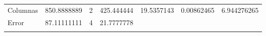 \documentclass[]{book}
\theoremstyle{definition}
\theoremstyle{definition}
\theoremstyle{definition}
\theoremstyle{remark}
\begin{document}
\begin{longtable}[]{@{}lllllll@{}}
\begin{minipage}[t]{0.15\columnwidth}
Columnas\strut
\end{minipage} & \begin{minipage}[t]{0.11\columnwidth}\raggedright
850.8888889\strut
\end{minipage} & \begin{minipage}[t]{0.12\columnwidth}\raggedright
2\strut
\end{minipage} & \begin{minipage}[t]{0.15\columnwidth}\raggedright
425.444444\strut
\end{minipage} & \begin{minipage}[t]{0.06\columnwidth}\raggedright
19.5357143\strut
\end{minipage} & \begin{minipage}[t]{0.08\columnwidth}\raggedright
0.00862465\strut
\end{minipage} & \begin{minipage}[t]{0.13\columnwidth}\raggedright
6.944276265\strut
\end{minipage}\tabularnewline
\begin{minipage}[t]{0.15\columnwidth}\raggedright
Error\strut
\end{minipage} & \begin{minipage}[t]{0.11\columnwidth}\raggedright
87.11111111\strut
\end{minipage} & \begin{minipage}[t]{0.12\columnwidth}\raggedright
4\strut
\end{minipage} & \begin{minipage}[t]{0.15\columnwidth}\raggedright
21.7777778\strut
\end{minipage} & \begin{minipage}[t]{0.06\columnwidth}\raggedright
\strut
\end{minipage} & \begin{minipage}[t]{0.08\columnwidth}\raggedright
\strut
\end{minipage} & \begin{minipage}[t]{0.13\columnwidth}\raggedright
\strut
\end{minipage}\tabularnewline
\begin{minipage}[t]{0.15\columnwidth}\raggedright
\strut
\end{minipage} & \begin{minipage}[t]{0.11\columnwidth}\raggedright
\strut
\end{minipage} & \begin{minipage}[t]{0.12\columnwidth}\raggedright
\strut
\end{minipage} & \begin{minipage}[t]{0.15\columnwidth}\raggedright

\end{minipage}
\end{longtable}
\end{document}
